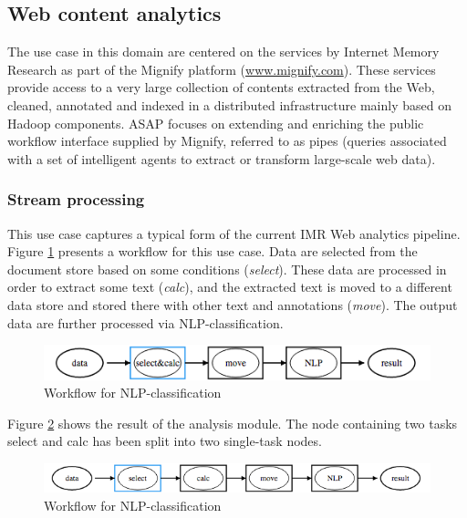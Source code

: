 \documentclass[12pt,openany,onecolumn]{book}
\begin{document}
\subsection{Web content analytics}
The use case in this domain are centered on the services by Internet Memory Research as part of the Mignify platform (\url{www.mignify.com}). These services provide access to a very large collection of contents extracted from the Web, cleaned, annotated and indexed in a distributed infrastructure mainly based on Hadoop components. ASAP focuses on extending and enriching the public workflow interface supplied by Mignify, referred to as pipes (queries associated with a set of intelligent agents to extract or transform large-scale web data).

\subsubsection{Stream processing}
This use case captures a typical form of the current IMR Web analytics pipeline. Figure \ref{fig:use_case_nlp} presents a workflow for this use case. Data are selected from the document store based on some conditions (\emph{select}). These data are processed in order to extract some text (\emph{calc}), and the extracted text is moved to a different data store and stored there with other text and annotations (\emph{move}). The output data are further processed via NLP-classification.

\begin{figure}[h]
\centering
\includegraphics[width=\linewidth]{figs/nlp}
\caption{Workflow for NLP-classification}\label{fig:use_case_nlp}
\end{figure}

Figure \ref{fig:use_case_nlp_analysed} shows the result of the analysis module. The node containing two tasks select and calc has been split into two single-task nodes.

\begin{figure}[h]
\centering
\includegraphics[width=\linewidth]{figs/nlp-a}
\caption{Workflow for NLP-classification}\label{fig:use_case_nlp_analysed}
\end{figure}
\end{document}

